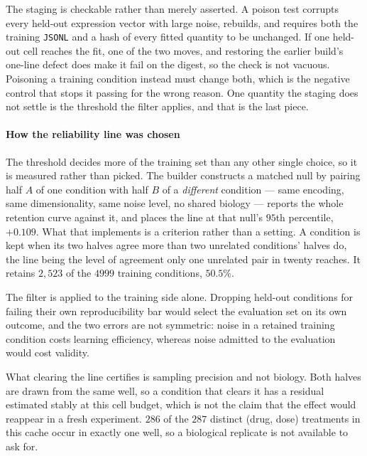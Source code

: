 The staging is checkable rather than merely asserted. A poison test corrupts every
held-out expression vector with large noise, rebuilds, and requires both the
training \texttt{JSONL} and a hash of every fitted quantity to be
unchanged. If one
held-out cell reaches the fit, one of the two moves, and restoring the earlier
build's one-line defect does make it fail on the digest, so the check is not
vacuous. Poisoning a training condition instead must change both, which is the
negative control that stops it passing for the wrong reason. One quantity the
staging does not settle is the threshold the filter applies, and that is the last
piece.


  \paragraph{How the reliability line was chosen} The threshold decides more of the
training set than any other single choice, so it is measured rather than picked.
The builder constructs a matched null by pairing half $A$ of one condition with
half $B$ of a \emph{different} condition --- same encoding, same dimensionality,
same noise level, no shared biology --- reports the whole retention curve against
it, and places the line at that null's $95$th percentile, $+0.109$. What that implements is a criterion
rather than a setting. A condition is kept when its two halves agree more than two
unrelated conditions' halves do, the line being the level of agreement only one
unrelated pair in twenty reaches. It retains $2{,}523$ of the $\num{4999}$
training conditions, $50.5\%$.

The filter is applied to the training side alone. Dropping held-out conditions for
failing their own reproducibility bar would select the evaluation set on its own
outcome, and the two errors are not symmetric: noise in a retained training
condition costs learning efficiency, whereas noise admitted to the evaluation
would cost validity.

What clearing the line certifies is sampling precision and not biology. Both
halves are drawn from the same well, so a condition that clears it has a residual
estimated stably at this cell budget, which is not the claim that the effect would
reappear in a fresh experiment. $\num{286}$ of the $\num{287}$ distinct (drug,
dose) treatments in this cache occur in exactly one well, so a biological
replicate is not available to ask for.

